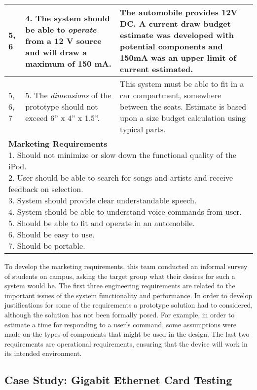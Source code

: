 \begin{longtable}{ |p{2.5cm}|p{5cm}|p{5.5cm}|}
5, 6 & 
4.   The system should be able to \emph{operate} from a 12 V source and
  will draw a maximum of 150 mA. &
The automobile provides 12V DC. A current draw budget
estimate was developed with potential components and 150mA was an upper
limit of current estimated. \\ \hline

5, 6, 7 & 
5.  The \emph{dimensions} of the prototype should not exceed 6'' x 4'' x  1.5''. &
This system must be able to fit in a car compartment,
somewhere between the seats. Estimate is based upon a size budget
calculation using typical parts. \\ \hline

\multicolumn{3}{|p{12cm}|}{
\textbf{Marketing Requirements}\newline
1. Should not minimize or slow down the functional quality of the iPod.\newline
2.  User should be able to search for songs and artists and receive feedback on selection.\newline
3.  System should provide clear understandable speech.\newline
4.  System should be able to understand voice commands from user.\newline
5.  Should be able to fit and operate in an automobile.\newline
6.  Should be easy to use.\newline
7.  Should be portable.
} \\ \hline
\end{longtable}

To develop the marketing requirements, this team conducted an informal
survey of students on campus, asking the target group what their desires
for such a system would be. The first three engineering requirements are
related to the important issues of the system functionality and
performance. In order to develop justifications for some of the
requirements a prototype solution had to considered, although the
solution has not been formally posed. For example, in order to estimate
a time for responding to a user's command, some assumptions were made on
the types of components that might be used in the design. The last two
requirements are operational requirements, ensuring that the device will
work in its intended environment.

\subsection{Case Study: Gigabit Ethernet Card Testing}
\label{subsection:case-study-gigabit-ethernet-card-testing}


